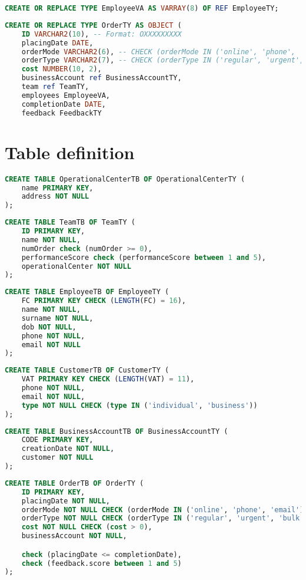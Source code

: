 \begin{lstlisting}[language=SQL]
CREATE OR REPLACE TYPE EmployeeVA AS VARRAY(8) OF REF EmployeeTY;
\end{lstlisting}

\begin{lstlisting}[language=SQL]    
CREATE OR REPLACE TYPE OrderTY AS OBJECT (
    ID VARCHAR2(10), -- Format: OXXXXXXXXX
    placingDate DATE,
    orderMode VARCHAR2(6), -- CHECK (orderMode IN ('online', 'phone', 'email')),
    orderType VARCHAR2(7), -- CHECK (orderType IN ('regular', 'urgent', 'bulk')),
    cost NUMBER(10, 2),
    businessAccount ref BusinessAccountTY,
    team ref TeamTY,
    employees EmployeeVA,
    completionDate DATE,
    feedback FeedbackTY
\end{lstlisting}

\section{Table definition}
\begin{lstlisting}[language=SQL]
CREATE TABLE OperationalCenterTB OF OperationalCenterTY (
    name PRIMARY KEY,
    address NOT NULL
); 
\end{lstlisting}

\begin{lstlisting}[language=SQL]
CREATE TABLE TeamTB OF TeamTY (
    ID PRIMARY KEY,
    name NOT NULL,
    numOrder check (numOrder >= 0),
    performanceScore check (performanceScore between 1 and 5),
    operationalCenter NOT NULL
);
\end{lstlisting}

\begin{lstlisting}[language=SQL]
CREATE TABLE EmployeeTB OF EmployeeTY (
    FC PRIMARY KEY CHECK (LENGTH(FC) = 16),
    name NOT NULL,
    surname NOT NULL,
    dob NOT NULL,
    phone NOT NULL,
    email NOT NULL
);
\end{lstlisting}

\begin{lstlisting}[language=SQL]
CREATE TABLE CustomerTB OF CustomerTY (
    VAT PRIMARY KEY CHECK (LENGTH(VAT) = 11),
    phone NOT NULL,
    email NOT NULL,
    type NOT NULL CHECK (type IN ('individual', 'business'))
);
\end{lstlisting}

\begin{lstlisting}[language=SQL]
CREATE TABLE BusinessAccountTB OF BusinessAccountTY (
    CODE PRIMARY KEY,
    creationDate NOT NULL,
    customer NOT NULL
);
\end{lstlisting}

\begin{lstlisting}[language=SQL]
CREATE TABLE OrderTB OF OrderTY (
    ID PRIMARY KEY,
    placingDate NOT NULL,
    orderMode NOT NULL CHECK (orderMode IN ('online', 'phone', 'email')),
    orderType NOT NULL CHECK (orderType IN ('regular', 'urgent', 'bulk')),
    cost NOT NULL CHECK (cost > 0),
    businessAccount NOT NULL,

    check (placingDate <= completionDate),
    check (feedback.score between 1 and 5)
);
\end{lstlisting}
